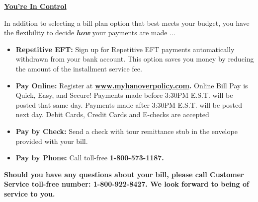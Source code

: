 \documentclass[10pt]{article}
\begin{document}
\noindent \textbf{\underline{You're In Control}}

\hfill \break
\noindent In addition to selecting a bill plan option that best meets your budget, you have the flexibility to decide \textbf{\emph{how}} your payments are made ...

\begin{itemize}
    \itemsep0em
    \item \textbf{Repetitive EFT:} Sign up for Repetitive EFT payments automatically withdrawn from your bank account. This option saves you money by reducing the amount of the installment service fee.

    \item \textbf{Pay Online:} Register at \textbf{\underline{www.myhanoverpolicy.com}.} Online Bill Pay is Quick, Easy, and Secure! Payments made before 3:30PM E.S.T. will be posted that same day. Payments made after 3:30PM E.S.T. will be posted next day. Debit Cards, Credit Cards and E-checks are accepted

    \item \textbf{Pay by Check:} Send a check with tour remittance stub in the envelope provided with your bill.
    
    \item \textbf{Pay by Phone:} Call toll-free \textbf{1-800-573-1187.}
\end{itemize}

\noindent \textbf{Should you have any questions about your bill, please call Customer Service toll-free number: 1-800-922-8427.
We look forward to being of service to you.}
\end{document}
